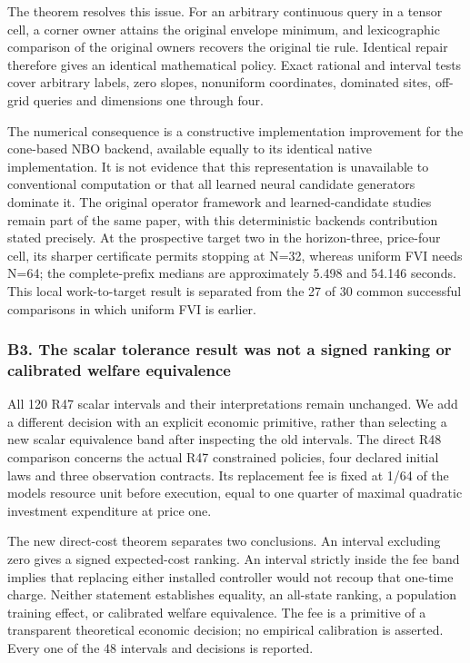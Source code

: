 \documentclass[ecta,nameyear,draft]{econsocart}
\begin{document}
The theorem resolves this issue. For an arbitrary continuous query in a
tensor cell, a corner owner attains the original envelope minimum, and
lexicographic comparison of the original owners recovers the original
tie rule. Identical repair therefore gives an identical mathematical
policy. Exact rational and interval tests cover arbitrary labels, zero
slopes, nonuniform coordinates, dominated sites, off-grid queries and
dimensions one through four.

The numerical consequence is a constructive implementation improvement
for the cone-based NBO backend, available equally to its identical
native implementation. It is not evidence that this representation is
unavailable to conventional computation or that all learned neural
candidate generators dominate it. The original operator framework and
learned-candidate studies remain part of the same paper, with this
deterministic backend\textquotesingle s contribution stated precisely.
At the prospective target two in the horizon-three, price-four cell, its
sharper certificate permits stopping at N=32, whereas uniform FVI needs
N=64; the complete-prefix medians are approximately 5.498 and 54.146
seconds. This local work-to-target result is separated from the 27 of 30
common successful comparisons in which uniform FVI is earlier.

\hypertarget{b3-the-scalar-tolerance-result-was-not-a-signed-ranking-or-calibrated-welfare-equivalence}{%
\subsubsection{B3. The scalar tolerance result was not a signed ranking
or calibrated welfare
equivalence}\label{b3-the-scalar-tolerance-result-was-not-a-signed-ranking-or-calibrated-welfare-equivalence}}

All 120 R47 scalar intervals and their interpretations remain unchanged.
We add a different decision with an explicit economic primitive, rather
than selecting a new scalar equivalence band after inspecting the old
intervals. The direct R48 comparison concerns the actual R47 constrained
policies, four declared initial laws and three observation contracts.
Its replacement fee is fixed at 1/64 of the model\textquotesingle s
resource unit before execution, equal to one quarter of maximal
quadratic investment expenditure at price one.

The new direct-cost theorem separates two conclusions. An interval
excluding zero gives a signed expected-cost ranking. An interval
strictly inside the fee band implies that replacing either installed
controller would not recoup that one-time charge. Neither statement
establishes equality, an all-state ranking, a population training
effect, or calibrated welfare equivalence. The fee is a primitive of a
transparent theoretical economic decision; no empirical calibration is
asserted. Every one of the 48 intervals and decisions is reported.
\end{document}
